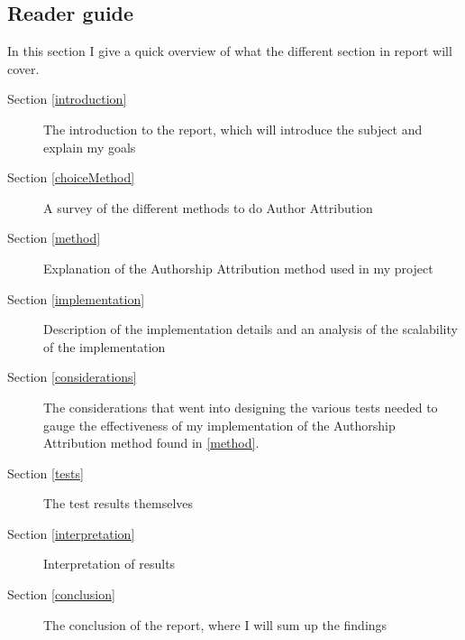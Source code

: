 \subsection{Reader guide}
In this section I give a quick overview of what the different section in report will cover.
\begin{description}
\item[Section \ref{introduction}] The introduction to the report, which will introduce the subject and explain my goals
\item[Section \ref{choiceMethod}] A survey of the different methods to do Author Attribution  
\item[Section \ref{method}] Explanation of the Authorship Attribution method used in my project
\item[Section \ref{implementation}] Description of the implementation details and an analysis of the scalability of the implementation
\item[Section \ref{considerations}] The considerations that went into designing the various tests needed to gauge the effectiveness of my implementation of the Authorship Attribution method found in \ref{method}.
\item[Section \ref{tests}] The test results themselves
\item[Section \ref{interpretation}] Interpretation of results
\item[Section \ref{conclusion}] The conclusion of the report, where I will sum up the findings  
\end{description}

